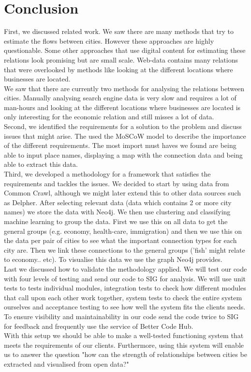 \section{Conclusion}

First, we discussed related work. We saw there are many methods that try to estimate the flows between cities. However these approaches are highly questionable. Some other approaches that use digital content for estimating these relations look promising but are small scale. Web-data contains many relations that were overlooked by methods like looking at the different locations where businesses are located. 
\\

We saw that there are currently two methods for analysing the relations between cities. Manually analysing search engine data is very slow and requires a lot of man-hours and looking at the different locations where businesses are located is only interesting for the economic relation and still misses a lot of data.
\\

Second, we identified the requirements for a solution to the problem and discuss issues that might arise. The used the MoSCoW model to describe the importance of the different requirements. The most import must haves we found are being able to input place names, displaying a map with the connection data and being able to extract this data.
\\

Third, we developed a methodology for a framework that satisfies the requirements and tackles the issues. We decided to start by using data from Common Crawl, although we might later extend this to other data sources such as Delpher. After selecting relevant data (data which contains 2 or more city names) we store the data with Neo4j. We then use clustering and classifying machine learning to group the data. First we use this on all data to get the general groups (e.g. economy, health-care, immigration) and then we use this on the data per pair of cities to see what the important connection types for each city are. Then we link these connections to the general groups ('fish' might relate to economy.. etc). To visualise this data we use the graph Neo4j provides.
\\

Last we discussed how to validate the methodology applied. We will test our code with four levels of testing and send our code to SIG for analysis. We will use unit tests to tests individual modules, integration tests to check how different modules that call upon each other work together, system tests to check the entire system ourselves and acceptance testing to see how well the system fits the clients needs. To ensure visibility and maintainability in our code send the code twice to SIG for feedback and frequently use the service of Better Code Hub.
\\

With this setup we should be able to make a well-tested functioning system that meets the requirements of our clients. Furthermore, using this system will enable us to answer the question "how can the strength of relationships between cities be extracted and visualised from open data?" 